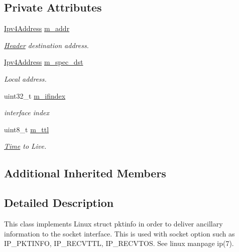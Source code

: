 \subsection*{Private Attributes}
\begin{DoxyCompactItemize}
\item 
\hyperlink{classns3_1_1Ipv4Address}{Ipv4\+Address} \hyperlink{classns3_1_1Ipv4PacketInfoTag_aa4264ecd6a3a8f0300f32bee4e75b7d0}{m\+\_\+addr}
\begin{DoxyCompactList}\small\item\em \hyperlink{classns3_1_1Header}{Header} destination address. \end{DoxyCompactList}\item 
\hyperlink{classns3_1_1Ipv4Address}{Ipv4\+Address} \hyperlink{classns3_1_1Ipv4PacketInfoTag_a8200ce51571008476143daeb3b292196}{m\+\_\+spec\+\_\+dst}
\begin{DoxyCompactList}\small\item\em Local address. \end{DoxyCompactList}\item 
uint32\+\_\+t \hyperlink{classns3_1_1Ipv4PacketInfoTag_ae75a1d491dcd857bf4809a92d83ff9ce}{m\+\_\+ifindex}
\begin{DoxyCompactList}\small\item\em interface index \end{DoxyCompactList}\item 
uint8\+\_\+t \hyperlink{classns3_1_1Ipv4PacketInfoTag_a2b80a48dd23f7d029a4e9472d1a40fc8}{m\+\_\+ttl}
\begin{DoxyCompactList}\small\item\em \hyperlink{classns3_1_1Time}{Time} to Live. \end{DoxyCompactList}\end{DoxyCompactItemize}
\subsection*{Additional Inherited Members}


\subsection{Detailed Description}
This class implements Linux struct pktinfo in order to deliver ancillary information to the socket interface. This is used with socket option such as I\+P\+\_\+\+P\+K\+T\+I\+N\+FO, I\+P\+\_\+\+R\+E\+C\+V\+T\+TL, I\+P\+\_\+\+R\+E\+C\+V\+T\+OS. See linux manpage ip(7). 

